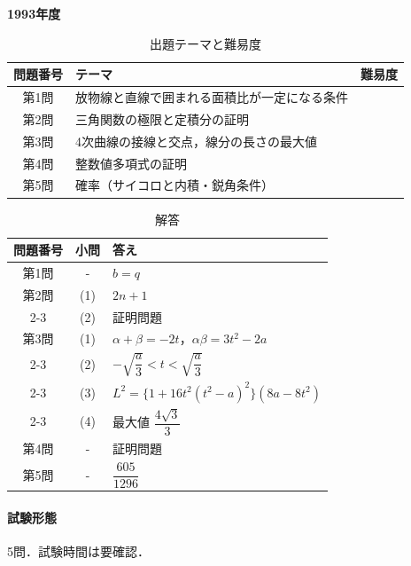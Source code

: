 \documentclass[../../main.tex]{subfiles}
\begin{document}
\begin{center}
  {\fontsize{48pt}{58pt}\selectfont \textbf{1993}\normalsize\textbf{年度}}
\end{center}

\begin{table}[htb]
  \centering
  \caption{出題テーマと難易度}
  \begin{tabular}{|c|p{9cm}|c|}
    \hline
    \textbf{問題番号} & \textbf{テーマ} & \textbf{難易度} \\
    \hline
    第1問 & 放物線と直線で囲まれる面積比が一定になる条件 & \\
    \hline
    第2問 & 三角関数の極限と定積分の証明 & \\
    \hline
    第3問 & 4次曲線の接線と交点，線分の長さの最大値 & \\
    \hline
    第4問 & 整数値多項式の証明 & \\
    \hline
    第5問 & 確率（サイコロと内積・鋭角条件） & \\
    \hline
  \end{tabular}
\end{table}

\begin{table}[htb]
  \centering
  \caption{解答}
  \renewcommand{\arraystretch}{1.4}
  \begin{tabular}{|c|c|p{9cm}|}
    \hline
    \textbf{問題番号} & \textbf{小問} & \textbf{答え} \\
    \hline
    第1問 & - & $b=q$ \\
    \hline
    第2問 & (1) & $2n+1$ \\
    \cline{2-3}
    & (2) & 証明問題 \\
    \hline
    第3問 & (1) & $\alpha+\beta=-2t$，$\alpha\beta=3t^2-2a$ \\
    \cline{2-3}
    & (2) & $-\sqrt{\dfrac{a}{3}}<t<\sqrt{\dfrac{a}{3}}$ \\
    \cline{2-3}
    & (3) & $L^2=\{1+16t^2(t^2-a)^2\}(8a-8t^2)$ \\
    \cline{2-3}
    & (4) & 最大値 $\dfrac{4\sqrt{3}}{3}$ \\
    \hline
    第4問 & - & 証明問題 \\
    \hline
    第5問 & - & $\dfrac{605}{1296}$ \\
    \hline
  \end{tabular}
\end{table}

\paragraph{試験形態}
5問．試験時間は要確認．
\end{document}
